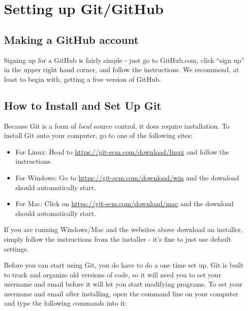 \documentclass[
]{book}
\newenvironment{Shaded}{\begin{snugshade}}{\end{snugshade}}
\newcommand{\NormalTok}[1]{#1}
\newcommand{\SpecialCharTok}[1]{\textcolor[rgb]{0.00,0.00,0.00}{#1}}
\newcommand{\StringTok}[1]{\textcolor[rgb]{0.31,0.60,0.02}{#1}}
\begin{document}
\hypertarget{setting-up-gitgithub}{%
\section{Setting up Git/GitHub}\label{setting-up-gitgithub}}

\hypertarget{making-a-github-account}{%
\subsection{Making a GitHub account}\label{making-a-github-account}}

Signing up for a GitHub is fairly simple - just go to GitHub.com, click ``sign up'' in the upper right hand corner, and follow the instructions. We recommend, at least to begin with, getting a free version of GitHub.

\hypertarget{how-to-install-and-set-up-git}{%
\subsection{How to Install and Set Up Git}\label{how-to-install-and-set-up-git}}

Because Git is a form of \emph{local} source control, it does require installation. To install Git onto your computer, go to one of the following sites:

\begin{itemize}
\item
  For Linux: Head to \url{https://git-scm.com/download/linux} and follow the instructions.
\item
  For Windows: Go to \url{https://git-scm.com/download/win} and the download should automatically start.
\item
  For Mac: Click on \url{https://git-scm.com/download/mac} and the download should automatically start.
\end{itemize}

If you are running Windows/Mac and the websites above download an installer, simply follow the instructions from the installer - it's fine to just use default settings.

Before you can start using Git, you do have to do a one time set up. Git is built to track and organize old versions of code, so it will need you to set your username and email before it will let you start modifying programs. To set your username and email after installing, open the command line on your computer and type the following commands into it:

\begin{Shaded}
\end{Shaded}
\end{document}
